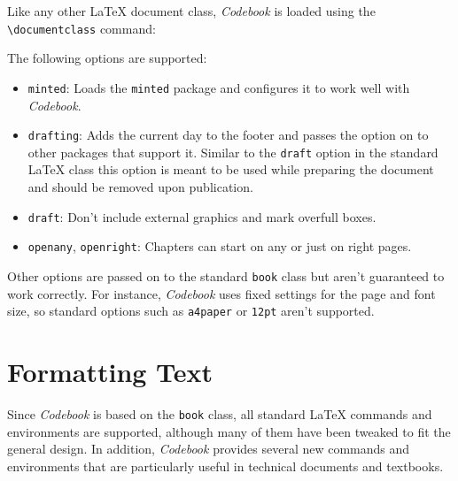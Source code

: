 \documentclass[minted]{codebook}
\begin{document}
\chapterindent
Like any other \LaTeX{} document class, \emph{Codebook} is loaded using the \verb|\documentclass| command:
The following options are supported:
\begin{itemize}
  \item \texttt{minted}: Loads the \texttt{minted} package and configures it to work well with \emph{Codebook}.
  \item \texttt{drafting}: Adds the current day to the footer and passes the option on to other packages that support it.
  Similar to the \verb|draft| option in the standard \LaTeX{} class this option is meant to be used while preparing the document and should be removed upon publication.
  \item \verb|draft|: Don't include external graphics and mark overfull boxes.
  \item \verb|openany|, \verb|openright|: Chapters can start on any or just on right pages.
\end{itemize}
Other options are passed on to the standard \verb|book| class but aren't guaranteed to work correctly.
For instance, \emph{Codebook} uses fixed settings for the page and font size, so standard options such as \verb|a4paper| or \verb|12pt| aren't supported.



\section{Formatting Text}

Since \emph{Codebook} is based on the \verb|book| class, all standard \LaTeX{} commands and environments are supported, although many of them have been tweaked to fit the general design.
In addition, \emph{Codebook} provides several new commands and environments that are particularly useful in technical documents and textbooks.
\end{document}
